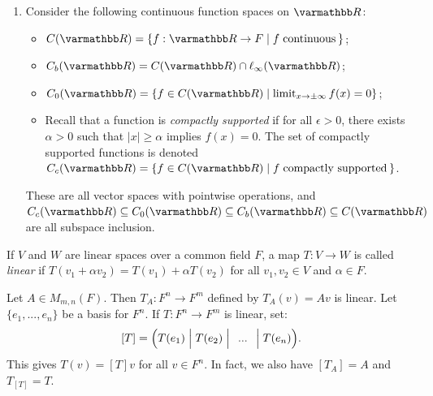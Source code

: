 \begin{example}
\begin{enumerate}[label = (\arabic*),itemsep=1pt,topsep=3pt]
            \item Consider the following continuous function spaces on $\bfR$:
                \begin{itemize}
                    \item $C(\bfR) = \{f:\bfR \rightarrow F \mid f \hspace{3pt}\text{continuous}\hspace{2pt}\}$;
                    \item $C_b(\bfR) = C(\bfR) \cap \ell_\infty(\bfR)$;
                    \item $C_0(\bfR) = \{f \in C(\bfR) \mid \limit_{x \rightarrow \pm\infty} f(x) = 0\}$;
                    \item Recall that a function is \textit{compactly supported} if for all $\epsilon > 0$, there exists $\alpha > 0$ such that $|x| \geq \alpha$ implies $f(x) = 0$. The set of compactly supported functions is denoted $C_c(\bfR) = \{f \in C(\bfR) \mid f \hspace{3pt}\text{compactly supported}\hspace{2pt}\}$.
                \end{itemize}
            These are all vector spaces with pointwise operations, and $C_c(\bfR) \subseteq C_0(\bfR) \subseteq C_b(\bfR) \subseteq C(\bfR)$ are all subspace inclusion.
        \end{enumerate}
    \end{example}

    \begin{definition}
        If $V$ and $W$ are linear spaces over a common field $F$, a map $T:V \rightarrow W$ is called \textit{linear} if $T(v_1 + \alpha v_2) = T(v_1) + \alpha T(v_2)$ for all $v_1,v_2 \in V$ and $\alpha \in F$.
    \end{definition}
    
    \begin{example}
        Let $A \in M_{m,n}(F)$. Then $T_A:F^n \rightarrow F^m$ defined by $T_A(v) = Av$ is linear. Let $\{e_1,...,e_n\}$ be a basis for $F^n$. If $T:F^n \rightarrow F^m$ is linear, set:
            \begin{equation*}
            \begin{split}
                [T] = \Bigl( T(e_1) \Bigm\vert T(e_2) \Bigm\vert \hspace{4.5pt}...\hspace{4.5pt}\Bigm\vert T(e_n) \Bigr).
            \end{split}
            \end{equation*}
        This gives $T(v) = [T]v$ for all $v \in F^n$. In fact, we also have $[T_A] = A$ and $T_{[T]} = T$.
    \end{example}

